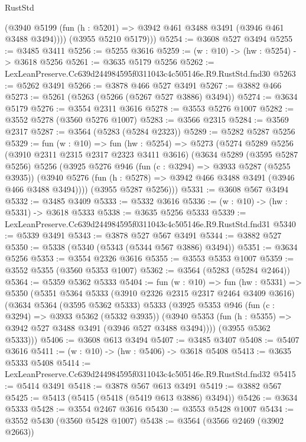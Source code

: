 \begin{lexlean}{RustStd}
\begin{coremodule}
          (@3940 @5199 (fun (h : @5201) => @3942 @461 @3488 @3491 (@3946 @461 @3488 @3494))))
        (@3955 @5210 @5179)))
@5254 := @3608 @527 @3494
@5255 := @3485 @3411
@5256 := @5255 @3616
@5259 := (w : @10) -> (hw : @5254) -> @3618 @5256
@5261 := @3635 @5179 @5256
@5262 := LexLeanPreserve.Cc639d244984595f0311043c4c505146e.R9.RustStd.fnd30
@5263 := @5262 @3491
@5266 := @3878 @466 @527 @3491
@5267 := @3882 @466
@5273 := @5261 (@5263 (@5266 (@5267 @527 @3886) @3494))
@5274 := @3634 @5179
@5276 := @3554 @2311 @3616
@5278 := @3553 @5276 @1007
@5282 := @3552 @5278 (@3560 @5276 @1007)
@5283 := @3566 @2315
@5284 := @3569 @2317
@5287 := @3564 (@5283 (@5284 @2323))
@5289 := @5282 @5287 @5256
@5329 := fun (w : @10) =>
  fun (hw : @5254) =>
  @5273
    (@5274
      @5289
      @5256
      (@3910 @2311 @2315 @2317 @2323 @3411 @3616)
      (@3634
        @5289
        (@3595 @5287 @5256)
        @5256
        (@3925
          @5276
          @946
          (fun (c : @3294) => @3933 @5287 (@5255 @3935))
          (@3940 @5276 (fun (h : @5278) => @3942 @466 @3488 @3491 (@3946 @466 @3488 @3494))))
        (@3955 @5287 @5256)))
@5331 := @3608 @567 @3494
@5332 := @3485 @3409
@5333 := @5332 @3616
@5336 := (w : @10) -> (hw : @5331) -> @3618 @5333
@5338 := @3635 @5256 @5333
@5339 := LexLeanPreserve.Cc639d244984595f0311043c4c505146e.R9.RustStd.fnd31
@5340 := @5339 @3491
@5343 := @3878 @527 @567 @3491
@5344 := @3882 @527
@5350 := @5338 (@5340 (@5343 (@5344 @567 @3886) @3494))
@5351 := @3634 @5256
@5353 := @3554 @2326 @3616
@5355 := @3553 @5353 @1007
@5359 := @3552 @5355 (@3560 @5353 @1007)
@5362 := @3564 (@5283 (@5284 @2464))
@5364 := @5359 @5362 @5333
@5404 := fun (w : @10) =>
  fun (hw : @5331) =>
  @5350
    (@5351
      @5364
      @5333
      (@3910 @2326 @2315 @2317 @2464 @3409 @3616)
      (@3634
        @5364
        (@3595 @5362 @5333)
        @5333
        (@3925
          @5353
          @946
          (fun (c : @3294) => @3933 @5362 (@5332 @3935))
          (@3940 @5353 (fun (h : @5355) => @3942 @527 @3488 @3491 (@3946 @527 @3488 @3494))))
        (@3955 @5362 @5333)))
@5406 := @3608 @613 @3494
@5407 := @3485 @3407
@5408 := @5407 @3616
@5411 := (w : @10) -> (hw : @5406) -> @3618 @5408
@5413 := @3635 @5333 @5408
@5414 := LexLeanPreserve.Cc639d244984595f0311043c4c505146e.R9.RustStd.fnd32
@5415 := @5414 @3491
@5418 := @3878 @567 @613 @3491
@5419 := @3882 @567
@5425 := @5413 (@5415 (@5418 (@5419 @613 @3886) @3494))
@5426 := @3634 @5333
@5428 := @3554 @2467 @3616
@5430 := @3553 @5428 @1007
@5434 := @3552 @5430 (@3560 @5428 @1007)
@5438 := @3564 (@3566 @2469 (@3902 @2663))

\end{coremodule}
\end{lexlean}

